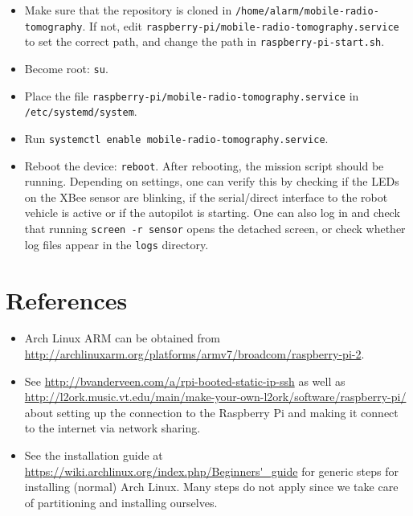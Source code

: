 \documentclass{article}
\begin{document}
\begin{itemize}
    \item Make sure that the repository is cloned in
          {\tt /home/alarm/mobile-radio-tomography}. If not, edit
          {\tt raspberry-pi/mobile-radio-tomography.service} to set the
          correct path, and change the path in {\tt raspberry-pi-start.sh}.
    \item Become root: {\tt su}.
    \item Place the file {\tt raspberry-pi/mobile-radio-tomography.service} in
          {\tt /etc/systemd/system}.
    \item Run {\tt systemctl enable mobile-radio-tomography.service}.
    \item Reboot the device: {\tt reboot}. After rebooting, the mission script 
          should be running. Depending on settings, one can verify this by 
          checking if the LEDs on the XBee sensor are blinking, if the 
          serial/direct interface to the robot vehicle is active or if the 
          autopilot is starting. One can also log in and check that running 
          {\tt screen -r sensor} opens the detached screen, or check whether 
          log files appear in the {\tt logs} directory.
\end{itemize}

\section{References}
\begin{itemize}
    \item Arch Linux ARM can be obtained from \url{http://archlinuxarm.org/platforms/armv7/broadcom/raspberry-pi-2}.
    \item See \url{http://bvanderveen.com/a/rpi-booted-static-ip-ssh} as well 
          as  
          \url{http://l2ork.music.vt.edu/main/make-your-own-l2ork/software/raspberry-pi/} 
          about setting up the connection to the Raspberry Pi and making it 
          connect to the internet via network sharing.
    \item See the installation guide at 
          \url{https://wiki.archlinux.org/index.php/Beginners'_guide} for 
          generic steps for installing (normal) Arch Linux. Many steps do not 
          apply since we take care of partitioning and installing ourselves.
\end{itemize}
\end{document}
